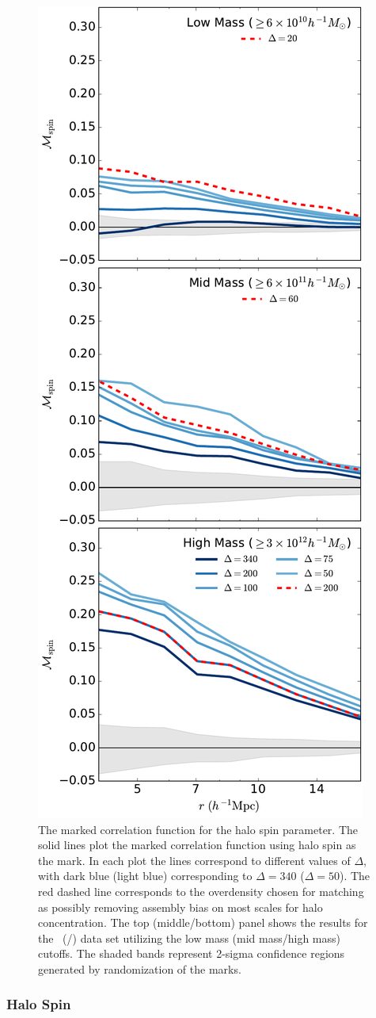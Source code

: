 \documentclass[usenatbib,fleqn]{mnras}
\begin{document}
\begin{figure}
	\centering
	\includegraphics[width=.4\textwidth]{all_mcf_spin.pdf}
	\caption{
The marked correlation function for the halo spin parameter. 
The solid lines plot the marked correlation function using halo spin as the mark. In each plot the lines correspond to different values of $\Delta$, with dark blue (light blue) corresponding to $\Delta = 340$ ($\Delta = 50$). The red dashed line corresponds to the overdensity chosen for matching as possibly removing assembly bias on most scales for halo concentration. The top (middle/bottom) panel shows the results for the
\simA \ (\simB /\simC) data set utilizing the low mass (mid mass/high mass) cutoffs. The shaded bands represent 2-sigma confidence regions generated by randomization of the marks.
	}
	\label{fig:cc_mcf_spin}
\end{figure}

\subsubsection{Halo Spin}
\end{document}
